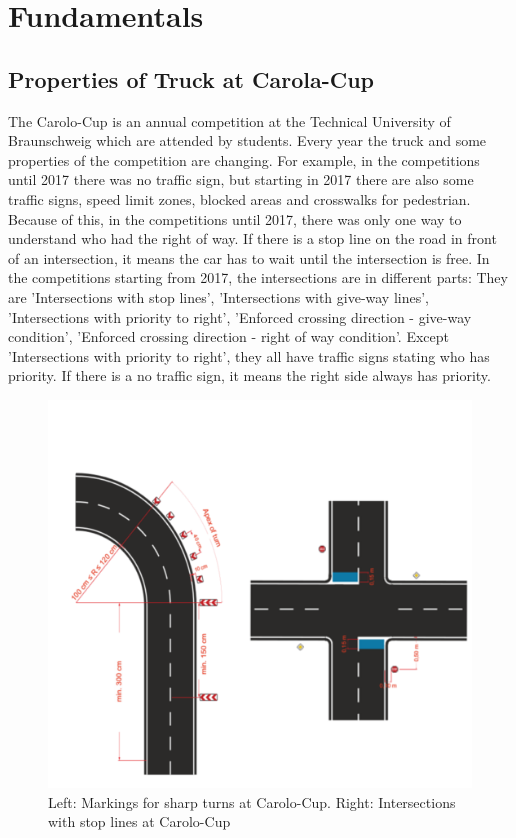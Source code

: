 %
\chapter{Fundamentals}\label{cha:Fundamentals}
%
%
\section{Properties of Truck at Carola-Cup}\label{sec:Properties of Truck at Carolo-Cup}
%
The Carolo-Cup is an annual competition at the Technical University of Braunschweig which are attended by students. Every year the truck and some properties of the competition are changing. For example, in the competitions until 2017 there was no traffic sign, but starting in 2017 there are also some traffic signs, speed limit zones, blocked areas and crosswalks for pedestrian. Because of this, in the competitions until 2017, there was only one way to understand who had the right of way. If there is a stop line on the road in front of an intersection, it means the car has to wait until the intersection is free. In the competitions starting from 2017, the intersections are in different parts: They are 'Intersections with stop lines', 'Intersections with give-way lines', 'Intersections with priority to right', 'Enforced crossing direction - give-way condition', 'Enforced crossing direction - right of way condition'. Except 'Intersections with priority to right', they all have traffic signs stating who has priority. If there is a no traffic sign, it means the right side always has priority.\cite{Carolo_Cup}

\begin{figure}[H]
	\centering
	\hspace*{0cm}   
	\includegraphics[width=120mm,scale=1]{./Bilder/Intersections.png}
	\caption{Left: Markings for sharp turns at Carolo-Cup.
Right: Intersections with stop lines at Carolo-Cup\cite{Carolo_Cup}}
\end{figure}

